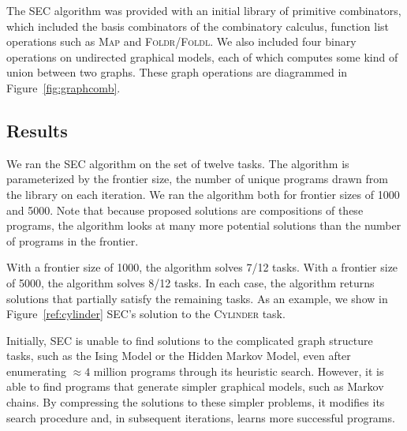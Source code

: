 \documentclass{article} %
\begin{document}
The SEC algorithm was provided with an initial library of primitive  combinators, which included the basis combinators of the combinatory calculus, function list operations such as \textsc{Map} and \textsc{Foldr}/\textsc{Foldl}. We also included four binary operations on undirected graphical models, each of which computes some kind of union between two graphs. These graph operations are diagrammed in Figure~\ref{fig:graphcomb}.




\subsection{Results}

We ran the SEC algorithm on the set of twelve tasks. The algorithm is parameterized by the frontier size, the number of unique programs drawn from the library on each iteration. We ran the algorithm both for frontier sizes of 1000 and 5000. Note that because proposed solutions are compositions of these programs, the algorithm looks at many more potential solutions than the number of programs in the frontier. 

With a frontier size of 1000, the algorithm solves 7/12 tasks. With a frontier size of 5000, the algorithm solves 8/12 tasks. In each case, the algorithm returns solutions that partially satisfy the remaining tasks. As an example, we show in Figure~\ref{ref:cylinder} SEC's solution to the \textsc{Cylinder} task. 

Initially, SEC is unable to find solutions to the complicated graph structure tasks, such as the Ising Model or the Hidden Markov Model, even after enumerating $\approx 4$ million programs through its heuristic search.
However, it is able to find programs that generate simpler graphical models, such as Markov chains.
By compressing the solutions to these simpler problems, it modifies its search procedure and, in subsequent iterations, learns more successful programs.
\end{document}
